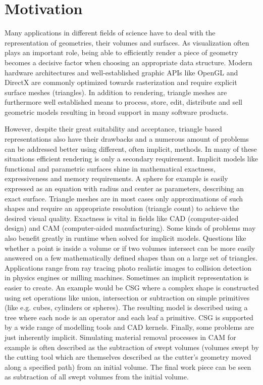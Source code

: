 
 
\section{Motivation}

Many applications in different fields of science have to deal with the representation of geometries, their volumes and surfaces. As visualization often plays an important role, being able to efficiently render a piece of geometry becomes a decisive factor when choosing an appropriate data structure. Modern hardware architectures and well-established graphic APIs like OpenGL and DirectX are commonly optimized towards rasterization and require explicit surface meshes (\ie triangles). In addition to rendering, triangle meshes are furthermore well established means to process, store, edit, distribute and sell geometric models resulting in broad support in many software products.

However, despite their great suitability and acceptance, triangle based representations also have their drawbacks and a numerous amount of problems can be addressed better using different, often implicit, methods. In many of these situations efficient rendering is only a secondary requirement. Implicit models like functional and parametric surfaces shine in mathematical exactness, expressiveness and memory requirements. A sphere for example is easily expressed as an equation with radius and center as parameters, describing an exact surface. Triangle meshes are in most cases only approximations of such shapes and require an appropriate resolution (\ie triangle count) to achieve the desired visual quality. Exactness is vital in fields like CAD (computer-aided design) and CAM (computer-aided manufacturing).
Some kinds of problems may also benefit greatly in runtime when solved for implicit models. Questions like whether a point is inside a volume or if two volumes intersect can be more easily answered on a few mathematically defined shapes than on a large set of triangles. Applications range from ray tracing photo realistic images to collision detection in physics engines or milling machines. 
Sometimes an implicit representation is easier to create. An example would be CSG where a complex shape is constructed using set operations like union, intersection or subtraction on simple primitives (like e.g. cubes, cylinders or spheres). The resulting model is described using a tree where each node is an operator and each leaf a primitive. CSG is supported by a wide range of modelling tools and CAD kernels.
Finally, some problems are just inherently implicit. Simulating material removal processes in CAM for example is often described as the subtraction of swept volumes (volumes swept by the cutting tool which are themselves described as the cutter's geometry moved along a specified path) from an initial volume. The final work piece can be seen as subtraction of all swept volumes from the initial volume.

